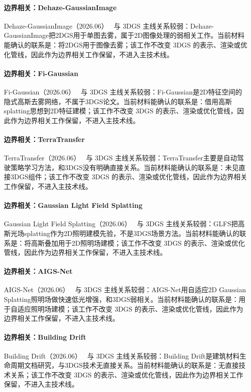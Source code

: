 \paragraph{边界相关：Dehaze-GaussianImage}
Dehaze-GaussianImage（2026.06）~\cite{2606_16163} 与 3DGS 主线关系较弱：Dehaze-GaussianImage把2DGS用于单图去雾，属于2D图像处理的弱相关工作。当前材料能确认的联系是：将2DGS用于图像去雾；该工作不改变 3DGS 的表示、渲染或优化管线，因此作为边界相关工作保留，不进入主技术线。

\paragraph{边界相关：Fi-Gaussian}
Fi-Gaussian（2026.06）~\cite{2606_16168} 与 3DGS 主线关系较弱：Fi-Gaussian是2D特征空间的隐式高斯去雾网络，不属于3DGS论文。当前材料能确认的联系是：借用高斯splatting思想到2D特征建模；该工作不改变 3DGS 的表示、渲染或优化管线，因此作为边界相关工作保留，不进入主技术线。

\paragraph{边界相关：TerraTransfer}
TerraTransfer（2026.06）~\cite{2606_17386} 与 3DGS 主线关系较弱：TerraTransfer主要是自动驾驶策略学习方法，和3DGS没有明确直接关系。当前材料能确认的联系是：未见直接3DGS组件；该工作不改变 3DGS 的表示、渲染或优化管线，因此作为边界相关工作保留，不进入主技术线。

\paragraph{边界相关：Gaussian Light Field Splatting}
Gaussian Light Field Splatting（2026.06）~\cite{2606_17985} 与 3DGS 主线关系较弱：GLFS把高斯光场splatting作为2D照明建模先验，不是3DGS场景方法。当前材料能确认的联系是：将高斯叠加用于2D照明场建模；该工作不改变 3DGS 的表示、渲染或优化管线，因此作为边界相关工作保留，不进入主技术线。

\paragraph{边界相关：AIGS-Net}
AIGS-Net（2026.06）~\cite{2606_17998} 与 3DGS 主线关系较弱：AIGS-Net用自适应2D Gaussian Splatting照明场做快速低光增强，和3DGS弱相关。当前材料能确认的联系是：用于自适应照明场建模；该工作不改变 3DGS 的表示、渲染或优化管线，因此作为边界相关工作保留，不进入主技术线。

\paragraph{边界相关：Building Drift}
Building Drift（2026.06）~\cite{2606_19609} 与 3DGS 主线关系较弱：Building Drift是建筑材料生命周期文档研究，与3DGS技术无直接关系。当前材料能确认的联系是：无直接技术关系；该工作不改变 3DGS 的表示、渲染或优化管线，因此作为边界相关工作保留，不进入主技术线。

